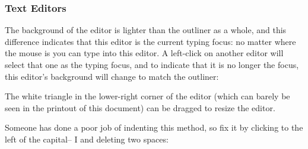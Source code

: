 \documentclass[letterpaper,10pt,english]{sphinxmanual}
\begin{document}
\subsubsection{Text Editors}
\label{howtoprg:text-editors}
The background of the editor is lighter than the outliner as a whole, and this difference indicates
that this editor is the current typing focus: no matter where the mouse is you can type into this editor.
A left-click on another editor will select that one as the typing focus, and to indicate that it is
no longer the focus, this editor’s background will change to match the outliner:
\begin{figure}[htbp]\begin{flushleft}

\end{flushleft}\end{figure}

The white triangle in the lower-right corner of the editor (which can barely be seen in the printout
of this document) can be dragged to resize the editor.

Someone has done a poor job of indenting this method, so fix it by clicking to the left of the capital–
I and deleting two spaces:
\begin{figure}[htbp]\begin{flushleft}

\end{flushleft}\end{figure}
\end{document}
